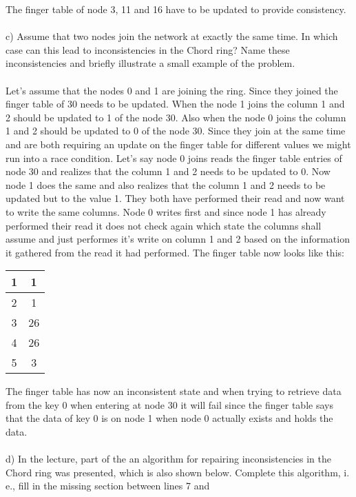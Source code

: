 \documentclass{article}
\begin{document}
The finger table of node 3, 11 and 16 have to be updated to provide consistency.\\
\\
c) Assume that two nodes join the network at exactly the same time. In which case can this lead to
inconsistencies in the Chord ring? Name these inconsistencies and briefly illustrate a small example of
the problem.\\
\\
Let's assume that the nodes 0 and 1 are joining the ring. Since they joined the finger table of 30 needs
to be updated. When the node 1 joins the column 1 and 2 should be updated to 1 of the node 30. Also when
the node 0 joins the column 1 and 2 should be updated to 0 of the node 30. Since they join at the same
time and are both requiring an update on the finger table for different values we might run into a race
condition. Let's say node 0 joins reads the finger table entries of node 30 and realizes that the column
1 and 2 needs to be updated to 0. Now node 1 does the same and also realizes that the column 1 and 2
needs to be updated but to the value 1. They both have performed their read and now want to write the same columns.
Node 0 writes first and since node 1 has already performed their read it does not check again which state
the columns shall assume and just performes it's write on column 1 and 2 based on the information it
gathered from the read it had performed. The finger table now looks like this:
\begin{center}
    \begin{tabular}{ |c|c| } 
        \hline
        1 & 1\\ 
        \hline
        2 & 1\\ 
        \hline
        3 & 26\\ 
        \hline
        4 & 26\\ 
        \hline
        5 & 3\\ 
        \hline
    \end{tabular}
\end{center}
The finger table has now an inconsistent state and when trying to retrieve data from the key 0 when entering
at node 30 it will fail since the finger table says that the data of key 0 is on node 1 when node 0 actually
exists and holds the data.\\
\\
d) In the lecture, part of the an algorithm for repairing inconsistencies in the Chord ring was presented,
which is also shown below. Complete this algorithm, i. e., fill in the missing section between lines 7 and 
\end{document}
